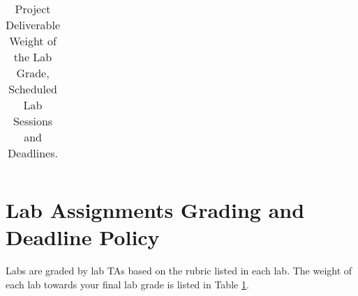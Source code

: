 \begin{table}
\begin{center}
\begin{tabular}{|p{4cm}|l|l|l|}
\end{tabular}
\caption{Project Deliverable Weight of the Lab Grade, Scheduled Lab Sessions and Deadlines.}
\label{tb_deadline}
\end{center}
\end{table}
\section*{Lab Assignments Grading and Deadline Policy} 
Labs are graded by lab TAs based on the rubric listed in each lab. The weight of each lab towards your final lab grade is listed in Table \ref{tb_deadline}. 

